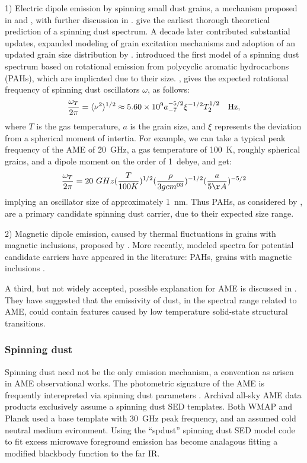     1) Electric dipole emission by spinning small dust grains, a mechanism proposed in \cite{erickson57} and \cite{hoyle70}, with further discussion in \cite{ferrara94}. \cite{draine98b} give the earliest thorough theoretical prediction of a spinning dust spectrum. A decade later \cite{ali-haimoud09} contributed substantial updates, expanded modeling of grain excitation mechanisms and adoption of an updated grain size distribution by \cite{weingartner01}. \cite{ysard10a} introduced the first model of a spinning dust spectrum based on rotational emission from polycyclic aromatic hydrocarbons (PAHs), which are implicated due to their size.  \cite{draine98b}, gives the expected rotational frequency of spinning dust oscillators $\omega$,  as follows:
        \begin{equation}
        {\omega_T\over 2\pi} =
        \langle\nu^2\rangle^{1/2}
        \approx 5.60\times 10^9 a_{-7}^{-5/2}\xi^{-1/2}T_2^{1/2}~~~{\rm Hz},
        \label{eq:nurms}
        \end{equation}
    where $T$ is the gas temperature, $a$ is the grain size, and $\xi$ represents the deviation from a spherical moment of intertia. For example, we can take a typical peak frequency of the AME of \~20~GHz, a gas temperature of 100~K, roughly spherical grains, and a dipole moment on the order of 1~debye, and get:
        \begin{equation}
            {\omega_T\over 2\pi} =
                20~GHz({T\over 100K})^{1/2}({\rho \over{3gcm^{03}}})^{-1/2}({a\over 5\AA{}})^{-5/2}
            \label{eq:nurms_ex}
        \end{equation}
    implying an oscillator size of approximately 1~nm. Thus PAHs, as considered by \cite{ysard10a}, are a primary candidate spinning dust carrier, due to their expected size range.

    2) Magnetic dipole emission, caused by thermal fluctuations in grains with magnetic inclusions, proposed by \cite{draine99}.
     More recently, modeled spectra for potential candidate carriers have appeared in the literature: PAHs, grains with magnetic inclusions \citep{draine13, ali-haimoud14, hoang16a}.

    A third, but not widely accepted, possible explanation for AME is discussed in \cite{jones09}. They have suggested that the emissivity of dust, in the spectral range related to AME, could contain features caused by low temperature solid-state structural transitions.

    \subsubsection{Spinning dust}
     Spinning dust need not be the only emission mechanism, a convention as arisen in AME observational works. The photometric signature of the AME is frequently interepreted via spinning dust parameters \citep{ysard11,ali-haimoud10}. Archival all-sky AME data products exclusively assume a spinning dust SED templates. Both WMAP and Planck used a base template with 30~GHz peak frequency, and an assumed cold neutral medium evironment. Using the ``spdust'' spinning dust SED model code to fit excess microwave foreground emission has become analagous fitting a modified blackbody function to the far IR.

